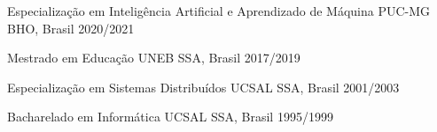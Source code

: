 


\begin{cvhonors}



\cvhonor
{Especialização em Inteligência Artificial e Aprendizado de Máquina} %
{PUC-MG} %
{BHO, Brasil} %
{2020/2021} %
    

\cvhonor
{Mestrado em Educação} %
{UNEB} %
{SSA, Brasil} %
{2017/2019} %



\cvhonor
{Especialização em Sistemas Distribuídos} %
{UCSAL} %
{SSA, Brasil} %
{2001/2003} %
    

\cvhonor
{Bacharelado em Informática} %
{UCSAL} %
{SSA, Brasil} %
{1995/1999} %


\end{cvhonors}
